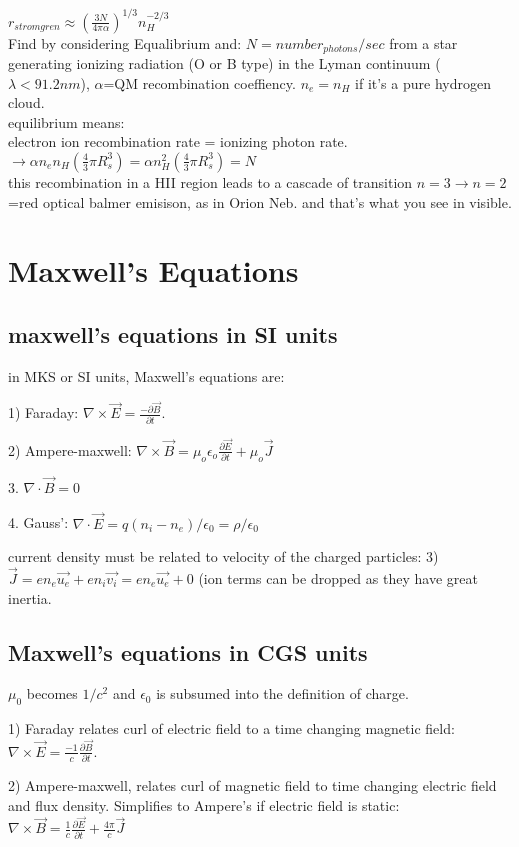 \documentclass[12pt]{report}
\begin{document}
 $r_{stromgren}\approx (\frac{3N}{4\pi\alpha})^{1/3}n_H^{-2/3}$\\
Find by considering Equalibrium and: $N=number_{photons}/sec$ from a star generating ionizing radiation (O or B type) in the Lyman continuum ($\lambda <91.2nm$), $\alpha$=QM recombination coeffiency. $n_e=n_H$ if it's a pure hydrogen cloud.\\ 
equilibrium means: \\electron ion recombination rate = ionizing photon rate.\\
$\rightarrow \alpha n_e n_H (\frac{4}{3}\pi R^3_s)= \alpha n_H^2(\frac{4}{3}\pi R^3_s)=N$\\
this recombination in a HII region leads to a cascade of transition $n=3\rightarrow n=2$=red optical balmer emisison, as in Orion Neb.  and that's what you see in visible.


\section{Maxwell's Equations }
\subsection{maxwell's equations in SI units}  
in MKS or SI units, Maxwell's equations are:

1) Faraday: $\nabla \times \vec{E} = \frac{-\partial \vec{B}}{\partial t}$.

2) Ampere-maxwell: $\nabla \times \vec{B} =\mu_o \epsilon_o\frac{\partial \vec{E}}{\partial t}+\mu_o \vec{J}$

3. $\nabla \cdot \vec{B}=0$

4. Gauss': $\nabla \cdot \vec{E}=q(n_i-n_e)/\epsilon_0=\rho/\epsilon_0$

current density must be related to velocity of the charged particles: 3) $\vec{J} = e n_e \vec{u_e}+e n_i \vec{v_i} =e n_e \vec{u_e}+0$ (ion terms can be dropped as they have great inertia.

\subsection{Maxwell's equations in CGS units}  
$\mu_0$ becomes $1/c^2$ and $\epsilon_0$ is subsumed into the definition of charge.

1) Faraday relates curl of electric field to a time changing magnetic field: $\nabla \times \vec{E} = \frac{-1}{c}\frac{\partial \vec{B}}{\partial t}$.

2) Ampere-maxwell, relates curl of magnetic field to time changing electric field and flux density. Simplifies to Ampere's if electric field is static:
 $\nabla \times \vec{B} =\frac{1}{c} \frac{\partial \vec{E}}{\partial t}+\frac{4\pi}{c}\vec{J}$
\end{document}
